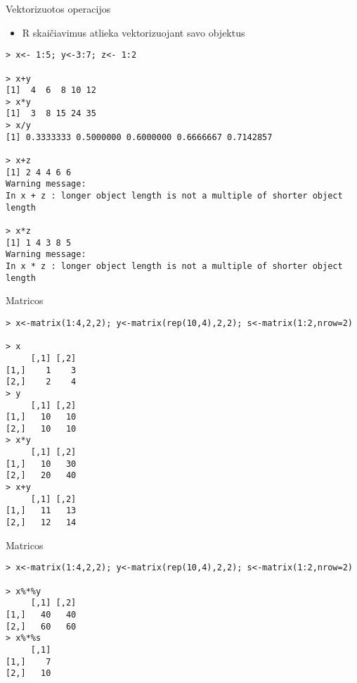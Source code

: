 \documentclass[11pt,xcolor=table]{beamer}
\begin{document}

\begin{frame}[fragile]{Vektorizuotos operacijos}
\begin{itemize}
\item R skaičiavimus atlieka vektorizuojant savo objektus
\end{itemize}
\begin{lstlisting}
> x<- 1:5; y<-3:7; z<- 1:2

> x+y
[1]  4  6  8 10 12
> x*y
[1]  3  8 15 24 35
> x/y
[1] 0.3333333 0.5000000 0.6000000 0.6666667 0.7142857

> x+z
[1] 2 4 4 6 6
Warning message:
In x + z : longer object length is not a multiple of shorter object length

> x*z
[1] 1 4 3 8 5
Warning message:
In x * z : longer object length is not a multiple of shorter object length
\end{lstlisting}
\end{frame}


\begin{frame}[fragile]{Matricos}
\begin{lstlisting}
> x<-matrix(1:4,2,2); y<-matrix(rep(10,4),2,2); s<-matrix(1:2,nrow=2)

> x
     [,1] [,2]
[1,]    1    3
[2,]    2    4
> y
     [,1] [,2]
[1,]   10   10
[2,]   10   10
> x*y
     [,1] [,2]
[1,]   10   30
[2,]   20   40
> x+y
     [,1] [,2]
[1,]   11   13
[2,]   12   14
\end{lstlisting}
\end{frame}

\begin{frame}[fragile]{Matricos}
\begin{lstlisting}
> x<-matrix(1:4,2,2); y<-matrix(rep(10,4),2,2); s<-matrix(1:2,nrow=2)

> x%*%y
     [,1] [,2]
[1,]   40   40
[2,]   60   60
> x%*%s
     [,1]
[1,]    7
[2,]   10
\end{lstlisting}
\end{frame}
\end{document}
